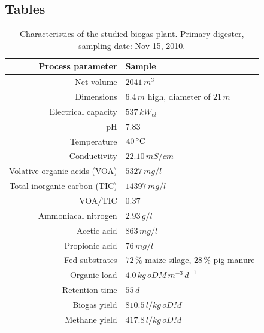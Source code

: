 \documentclass{bmcart}
\begin{document}
\begin{backmatter}


\section*{Tables}
\begin{table}[h!]
\caption{Characteristics of the studied biogas plant. Primary digester, sampling date: Nov 15, 2010.}
\begin{tabular}{rl}
\hline
Process parameter & Sample\\
\hline
Net volume & $2041\,m^{3}$\\
Dimensions & $6.4\,m$ high, diameter of $21\,m$\\
Electrical capacity & $537\,kW_{el}$\\
\hline
pH & $7.83$\\
Temperature & $40\,^{\circ}{\rm C}$\\
Conductivity & $22.10\,mS/cm$\\
Volative organic acids (VOA) & $5327\,mg/l$\\
Total inorganic carbon (TIC) & $14397\,mg/l$\\
VOA/TIC & $0.37$\\
Ammoniacal nitrogen & $2.93\,g/l$\\
Acetic acid & $863\,mg/l$\\
Propionic acid & $76\,mg/l$\\
\hline
Fed substrates & $72\,\%$ maize silage, $28\,\%$ pig manure\\
Organic load & $4.0\,kg\,oDM\,m^{-3}\,d^{-1}$\\
Retention time & $55\,d$\\
Biogas yield & $810.5\,l/kg\,oDM$\\
Methane yield & $417.8\,l/kg\,oDM$\\
\hline
\end{tabular}
\label{tBiogasPlant}
\end{table}


\end{backmatter}
\end{document}
